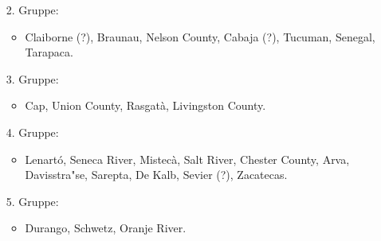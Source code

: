 \documentclass[a4paper, 11pt, oneside]{article}
\begin{document}
\begin{itemize}
\begin{itemize}
\begin{itemize}
        \end{itemize}
        \item[2.] Gruppe:
        \begin{itemize}
            \item Claiborne (?), Braunau, Nelson County, Cabaja (?), Tucuman, Senegal, Tarapaca.
        \end{itemize}
        \item[3.] Gruppe:
        \begin{itemize}
            \item Cap, Union County, Rasgatà, Livingston County.
        \end{itemize}
        \item[4.] Gruppe:
        \begin{itemize}
            \item Lenartó, Seneca River, Mistecà, Salt River, Chester County, Arva, Davisstra"se, Sarepta, De Kalb, Sevier (?), Zacatecas.
        \end{itemize}
        \item[5.] Gruppe:
        \begin{itemize}
            \item Durango, Schwetz, Oranje River.
        \end{itemize}
    \end{itemize}
\end{itemize}
\clearpage
\end{document}
